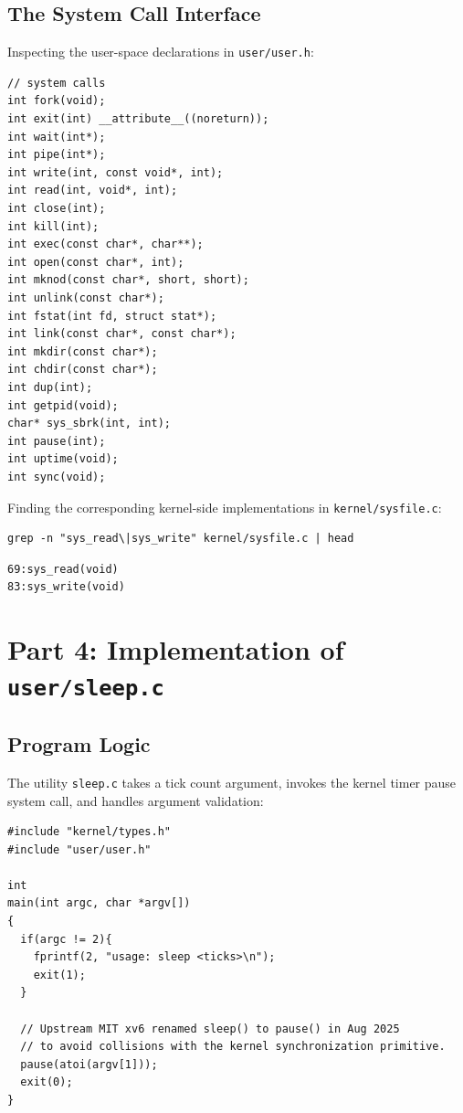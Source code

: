 \documentclass[12pt,a4paper]{article}
\begin{document}
\subsection{The System Call Interface}
Inspecting the user-space declarations in \texttt{user/user.h}:
\begin{lstlisting}[style=cstyle]
// system calls
int fork(void);
int exit(int) __attribute__((noreturn));
int wait(int*);
int pipe(int*);
int write(int, const void*, int);
int read(int, void*, int);
int close(int);
int kill(int);
int exec(const char*, char**);
int open(const char*, int);
int mknod(const char*, short, short);
int unlink(const char*);
int fstat(int fd, struct stat*);
int link(const char*, const char*);
int mkdir(const char*);
int chdir(const char*);
int dup(int);
int getpid(void);
char* sys_sbrk(int, int);
int pause(int);
int uptime(void);
int sync(void);
\end{lstlisting}

Finding the corresponding kernel-side implementations in \texttt{kernel/sysfile.c}:
\begin{lstlisting}[style=bashstyle]
grep -n "sys_read\|sys_write" kernel/sysfile.c | head
\end{lstlisting}
\begin{lstlisting}[style=consolestyle]
69:sys_read(void)
83:sys_write(void)
\end{lstlisting}

\section{Part 4: Implementation of \texttt{user/sleep.c}}

\subsection{Program Logic}
The utility \texttt{sleep.c} takes a tick count argument, invokes the kernel timer pause system call, and handles argument validation:
\begin{lstlisting}[style=cstyle]
#include "kernel/types.h"
#include "user/user.h"

int
main(int argc, char *argv[])
{
  if(argc != 2){
    fprintf(2, "usage: sleep <ticks>\n");
    exit(1);
  }

  // Upstream MIT xv6 renamed sleep() to pause() in Aug 2025
  // to avoid collisions with the kernel synchronization primitive.
  pause(atoi(argv[1]));
  exit(0);
}
\end{lstlisting}
\end{document}
